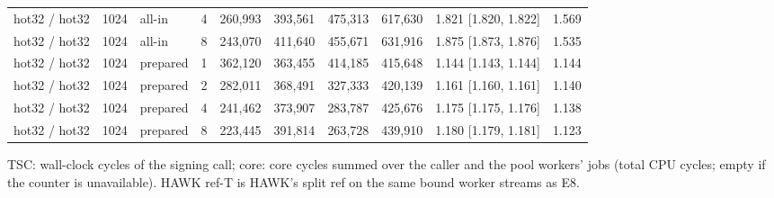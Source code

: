 \begin{table}[t]
{\begin{tabular}{lrlrrrrrlr}
hot32 / hot32 & 1024 & all-in & 4 & 260{,}993 & 393{,}561 & 475{,}313 & 617{,}630 & 1.821 [1.820, 1.822] & 1.569 \\
hot32 / hot32 & 1024 & all-in & 8 & 243{,}070 & 411{,}640 & 455{,}671 & 631{,}916 & 1.875 [1.873, 1.876] & 1.535 \\
hot32 / hot32 & 1024 & prepared & 1 & 362{,}120 & 363{,}455 & 414{,}185 & 415{,}648 & 1.144 [1.143, 1.144] & 1.144 \\
hot32 / hot32 & 1024 & prepared & 2 & 282{,}011 & 368{,}491 & 327{,}333 & 420{,}139 & 1.161 [1.160, 1.161] & 1.140 \\
hot32 / hot32 & 1024 & prepared & 4 & 241{,}462 & 373{,}907 & 283{,}787 & 425{,}676 & 1.175 [1.175, 1.176] & 1.138 \\
hot32 / hot32 & 1024 & prepared & 8 & 223{,}445 & 391{,}814 & 263{,}728 & 439{,}910 & 1.180 [1.179, 1.181] & 1.123 \\
\bottomrule
\end{tabular}}
\par\smallskip\parbox{\linewidth}{\scriptsize TSC: wall-clock cycles of the signing call; core: core cycles summed over the caller and the pool workers' jobs (total CPU cycles; empty if the counter is unavailable). HAWK ref-T is HAWK's split ref on the same bound worker streams as E8.}
\end{table}

